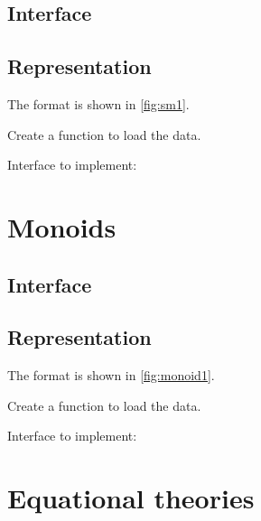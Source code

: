 \subsection{Interface}



\subsection{Representation}

The format is shown in \cref{fig:sm1}.


\begin{exercise}[Representation]
  Create a function to load the data.

  Interface to implement:
%

\end{exercise}


\section{Monoids}

\subsection{Interface}



\subsection{Representation}

The format is shown in \cref{fig:monoid1}.



\begin{exercise}[Representation]
  Create a function to load the data.

  Interface to implement:
%

\end{exercise}


\section{Equational theories}



